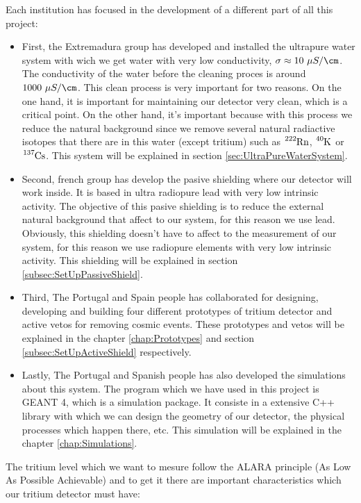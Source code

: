 Each institution has focused in the development of a different part of all this project:
\begin{itemize}
\item{} First, the Extremadura group has developed and installed the ultrapure water system with wich we get water with very low conductivity, $\sigma \approx 10 ~\mu S / \cm$. The conductivity of the water before the cleaning proces is around $ 1000 ~\mu S / \cm$. This clean process is very important for two reasons. On the one hand, it is important for maintaining our detector very clean, which is a critical point. On the other hand, it's important because with this process we reduce the natural background since we remove several natural radiactive isotopes that there are in this water (except tritium) such as $\ce{^{222}Rn}$, $\ce{^{40}K}$ or $\ce{^{137}Cs}$. This system will be explained in section \ref{sec:UltraPureWaterSystem}.

\item{} Second, french group has develop the pasive shielding where our detector will work inside. It is based in ultra radiopure lead with very low intrinsic activity. The objective of this pasive shielding is to reduce the external natural background that affect to our system, for this reason we use lead. Obviously, this shielding doesn't have to affect to the measurement of our system, for this reason we use radiopure elements with very low intrinsic activity. This shielding will be explained in section \ref{subsec:SetUpPassiveShield}.

\item{} Third, The Portugal and Spain people has collaborated for designing, developing and building four different prototypes of tritium detector and active vetos for removing cosmic events. These prototypes and vetos will be explained in the chapter \ref{chap:Prototypes} and section \ref{subsec:SetUpActiveShield} respectively.

\item{} Lastly, The Portugal and Spanish people has also developed the simulations about this system. The program which we have used in this project is GEANT 4, which is a simulation package. It consiste in a extensive C++ library with which we can design the geometry of our detector, the physical processes which happen there, etc. This simulation will be explained in the chapter \ref{chap:Simulations}.

\end{itemize}

The tritium level which we want to mesure follow the ALARA principle (As Low As Possible Achievable) and to get it there are important characteristics which our tritium detector must have:

